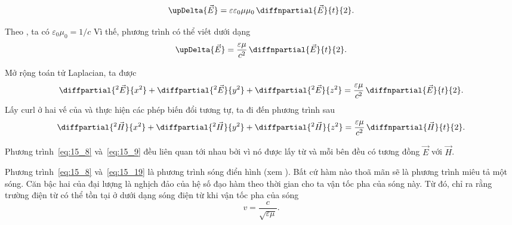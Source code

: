 \begin{equation*}
    \upDelta{\vec{E}} = \varepsilon\varepsilon_0 \mu\mu_0\, \diffnpartial{\vec{E}}{t}{2}.
\end{equation*}

\noindent
Theo , ta có $\varepsilon_0\mu_0=1/c$
Vì thế, phương trình có thể viết dưới dạng 
\begin{equation}\label{eq:15_7}
    \upDelta{\vec{E}} = \frac{\varepsilon\mu}{c^2}\, \diffnpartial{\vec{E}}{t}{2}.
\end{equation}

\noindent
Mở rộng toán tử Laplacian, ta được 
\begin{equation}\label{eq:15_8}
    \diffpartial{^2\vec{E}}{x^{2}} + \diffpartial{^2\vec{E}}{y^{2}} + \diffpartial{^2\vec{E}}{z^{2}} = \frac{\varepsilon\mu}{c^2}\, \diffnpartial{\vec{E}}{t}{2}.
\end{equation}
Lấy curl ở hai vế của  và thực hiện các phép biến đổi tương tự, ta đi đến phương trình sau
\begin{equation}\label{eq:15_9}
    \diffpartial{^2\vec{H}}{x^2} + \diffpartial{^2\vec{H}}{y^{2}} + \diffpartial{^2\vec{H}}{z^{2}} = \frac{\varepsilon\mu}{c^2}\, \diffnpartial{\vec{H}}{t}{2}.
\end{equation}

\noindent
Phương trình~\eqref{eq:15_8} và~\eqref{eq:15_9} đều liên quan tới nhau bởi vì nó được lấy từ  và mỗi bên đều 
có tương đồng $\vec{E}$ với $\vec{H}$.

Phương trình~\eqref{eq:15_8} và~\eqref{eq:15_19} là phương trình sóng điển hình (xem ).
Bất cứ hàm nào thoã mãn sẽ là phương trình miêu tả một sóng.
Căn bậc hai của đại lượng là nghịch đảo của hệ số đạo hàm theo thời gian cho ta vận tốc pha của sóng này.
Từ đó,  chỉ ra rằng trường điện từ có thể tồn tại ở dưới dạng sóng điện từ khi vận tốc pha của sóng
\begin{equation}\label{eq:15_10}
    v = \frac{c}{\sqrt{\varepsilon\mu}}.
\end{equation}


